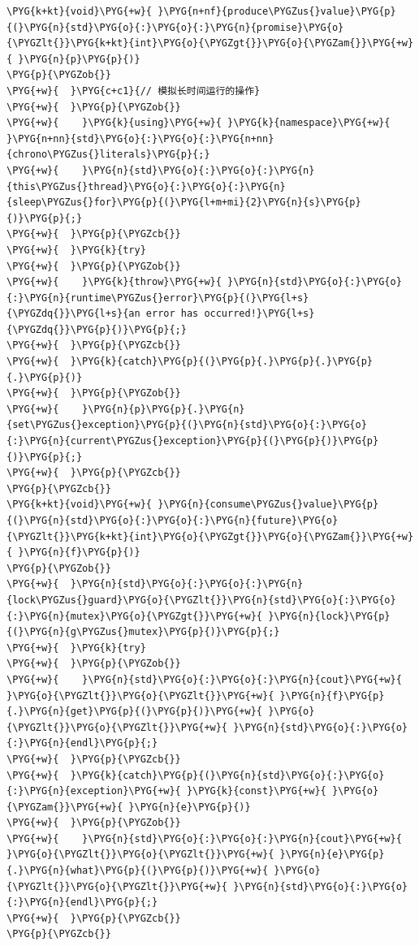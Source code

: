 \begin{codeblockbg}
\begin{Verbatim}[commandchars=\\\{\},breaklines=true,breakanywhere=true,fontsize=\codefont,xleftmargin=17bp]
\PYG{k+kt}{void}\PYG{+w}{ }\PYG{n+nf}{produce\PYGZus{}value}\PYG{p}{(}\PYG{n}{std}\PYG{o}{:}\PYG{o}{:}\PYG{n}{promise}\PYG{o}{\PYGZlt{}}\PYG{k+kt}{int}\PYG{o}{\PYGZgt{}}\PYG{o}{\PYGZam{}}\PYG{+w}{ }\PYG{n}{p}\PYG{p}{)}
\PYG{p}{\PYGZob{}}
\PYG{+w}{  }\PYG{c+c1}{// 模拟长时间运行的操作}
\PYG{+w}{  }\PYG{p}{\PYGZob{}}
\PYG{+w}{    }\PYG{k}{using}\PYG{+w}{ }\PYG{k}{namespace}\PYG{+w}{ }\PYG{n+nn}{std}\PYG{o}{:}\PYG{o}{:}\PYG{n+nn}{chrono\PYGZus{}literals}\PYG{p}{;}
\PYG{+w}{    }\PYG{n}{std}\PYG{o}{:}\PYG{o}{:}\PYG{n}{this\PYGZus{}thread}\PYG{o}{:}\PYG{o}{:}\PYG{n}{sleep\PYGZus{}for}\PYG{p}{(}\PYG{l+m+mi}{2}\PYG{n}{s}\PYG{p}{)}\PYG{p}{;}
\PYG{+w}{  }\PYG{p}{\PYGZcb{}}
\PYG{+w}{  }\PYG{k}{try}
\PYG{+w}{  }\PYG{p}{\PYGZob{}}
\PYG{+w}{    }\PYG{k}{throw}\PYG{+w}{ }\PYG{n}{std}\PYG{o}{:}\PYG{o}{:}\PYG{n}{runtime\PYGZus{}error}\PYG{p}{(}\PYG{l+s}{\PYGZdq{}}\PYG{l+s}{an error has occurred!}\PYG{l+s}{\PYGZdq{}}\PYG{p}{)}\PYG{p}{;}
\PYG{+w}{  }\PYG{p}{\PYGZcb{}}
\PYG{+w}{  }\PYG{k}{catch}\PYG{p}{(}\PYG{p}{.}\PYG{p}{.}\PYG{p}{.}\PYG{p}{)}
\PYG{+w}{  }\PYG{p}{\PYGZob{}}
\PYG{+w}{    }\PYG{n}{p}\PYG{p}{.}\PYG{n}{set\PYGZus{}exception}\PYG{p}{(}\PYG{n}{std}\PYG{o}{:}\PYG{o}{:}\PYG{n}{current\PYGZus{}exception}\PYG{p}{(}\PYG{p}{)}\PYG{p}{)}\PYG{p}{;}
\PYG{+w}{  }\PYG{p}{\PYGZcb{}}
\PYG{p}{\PYGZcb{}}
\PYG{k+kt}{void}\PYG{+w}{ }\PYG{n}{consume\PYGZus{}value}\PYG{p}{(}\PYG{n}{std}\PYG{o}{:}\PYG{o}{:}\PYG{n}{future}\PYG{o}{\PYGZlt{}}\PYG{k+kt}{int}\PYG{o}{\PYGZgt{}}\PYG{o}{\PYGZam{}}\PYG{+w}{ }\PYG{n}{f}\PYG{p}{)}
\PYG{p}{\PYGZob{}}
\PYG{+w}{  }\PYG{n}{std}\PYG{o}{:}\PYG{o}{:}\PYG{n}{lock\PYGZus{}guard}\PYG{o}{\PYGZlt{}}\PYG{n}{std}\PYG{o}{:}\PYG{o}{:}\PYG{n}{mutex}\PYG{o}{\PYGZgt{}}\PYG{+w}{ }\PYG{n}{lock}\PYG{p}{(}\PYG{n}{g\PYGZus{}mutex}\PYG{p}{)}\PYG{p}{;}
\PYG{+w}{  }\PYG{k}{try}
\PYG{+w}{  }\PYG{p}{\PYGZob{}}
\PYG{+w}{    }\PYG{n}{std}\PYG{o}{:}\PYG{o}{:}\PYG{n}{cout}\PYG{+w}{ }\PYG{o}{\PYGZlt{}}\PYG{o}{\PYGZlt{}}\PYG{+w}{ }\PYG{n}{f}\PYG{p}{.}\PYG{n}{get}\PYG{p}{(}\PYG{p}{)}\PYG{+w}{ }\PYG{o}{\PYGZlt{}}\PYG{o}{\PYGZlt{}}\PYG{+w}{ }\PYG{n}{std}\PYG{o}{:}\PYG{o}{:}\PYG{n}{endl}\PYG{p}{;}
\PYG{+w}{  }\PYG{p}{\PYGZcb{}}
\PYG{+w}{  }\PYG{k}{catch}\PYG{p}{(}\PYG{n}{std}\PYG{o}{:}\PYG{o}{:}\PYG{n}{exception}\PYG{+w}{ }\PYG{k}{const}\PYG{+w}{ }\PYG{o}{\PYGZam{}}\PYG{+w}{ }\PYG{n}{e}\PYG{p}{)}
\PYG{+w}{  }\PYG{p}{\PYGZob{}}
\PYG{+w}{    }\PYG{n}{std}\PYG{o}{:}\PYG{o}{:}\PYG{n}{cout}\PYG{+w}{ }\PYG{o}{\PYGZlt{}}\PYG{o}{\PYGZlt{}}\PYG{+w}{ }\PYG{n}{e}\PYG{p}{.}\PYG{n}{what}\PYG{p}{(}\PYG{p}{)}\PYG{+w}{ }\PYG{o}{\PYGZlt{}}\PYG{o}{\PYGZlt{}}\PYG{+w}{ }\PYG{n}{std}\PYG{o}{:}\PYG{o}{:}\PYG{n}{endl}\PYG{p}{;}
\PYG{+w}{  }\PYG{p}{\PYGZcb{}}
\PYG{p}{\PYGZcb{}}
\end{Verbatim}
\end{codeblockbg}


